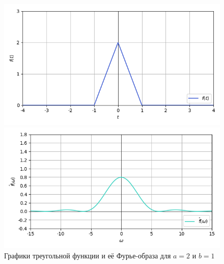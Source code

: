 \documentclass[a4paper]{article}
\begin{document}
\begin{figure}[H]
    \begin{minipage}{0.5\textwidth}
        \centering \includegraphics[width=\textwidth]{sources/2_triangular/graph_2.png}
    \end{minipage}\hfill
    \begin{minipage}{0.5\textwidth}
        \centering \includegraphics[width=\textwidth]{sources/2_triangular/fourier_2.png}
    \end{minipage}
    \caption{Графики треугольной функции и её Фурье-образа для $a = 2$ и $b = 1$} 
\end{figure}
\end{document}
